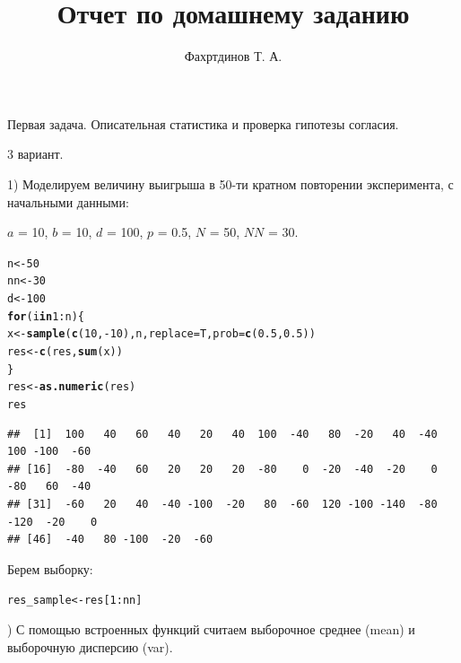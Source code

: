 \documentclass{article}\usepackage[]{graphicx}\usepackage[]{color}
\makeatletter
\newcommand{\hlnum}[1]{\textcolor[rgb]{0.686,0.059,0.569}{#1}}%
\newcommand{\hlopt}[1]{\textcolor[rgb]{0,0,0}{#1}}%
\newcommand{\hlstd}[1]{\textcolor[rgb]{0.345,0.345,0.345}{#1}}%
\newcommand{\hlkwa}[1]{\textcolor[rgb]{0.161,0.373,0.58}{\textbf{#1}}}%
\newcommand{\hlkwb}[1]{\textcolor[rgb]{0.69,0.353,0.396}{#1}}%
\newcommand{\hlkwc}[1]{\textcolor[rgb]{0.333,0.667,0.333}{#1}}%
\newcommand{\hlkwd}[1]{\textcolor[rgb]{0.737,0.353,0.396}{\textbf{#1}}}%
\newenvironment{kframe}{%
 \def\at@end@of@kframe{}%
 \ifinner\ifhmode%
  \def\at@end@of@kframe{\end{minipage}}%
  \begin{minipage}{\columnwidth}%
 \fi\fi%
 \def\FrameCommand##1{\hskip\@totalleftmargin \hskip-\fboxsep
 \colorbox{shadecolor}{##1}\hskip-\fboxsep
     \hskip-\linewidth \hskip-\@totalleftmargin \hskip\columnwidth}%
 \MakeFramed {\advance\hsize-\width
   \@totalleftmargin\z@ \linewidth\hsize
   \@setminipage}}%
 {\par\unskip\endMakeFramed%
 \at@end@of@kframe}
\newenvironment{knitrout}{}{} %
\makeatother
\begin{document}
\title{Отчет по домашнему заданию}
\pretitle{\vspace{\droptitle}\centering\huge}
\posttitle{\par}
\author{Фахртдинов Т. А.}


\maketitle
Первая задача. Описательная статистика и проверка гипотезы согласия.

3 вариант.

1) Моделируем величину выигрыша в 50-ти кратном повторении эксперимента, с начальными данными:

$a$ = 10, $b$ = 10, $d$ = 100, $p$ = 0.5, $N$ = 50, $NN$ = 30.

\begin{knitrout}
\color{fgcolor}\begin{kframe}
\begin{alltt}
\hlstd{n} \hlkwb{<-} \hlnum{50}
\hlstd{nn} \hlkwb{<-} \hlnum{30}
\hlstd{d} \hlkwb{<-} \hlnum{100}
\hlkwa{for} \hlstd{(i} \hlkwa{in} \hlnum{1} \hlopt{:} \hlstd{n) \{}
  \hlstd{x} \hlkwb{<-} \hlkwd{sample}\hlstd{(}\hlkwd{c}\hlstd{(}\hlnum{10}\hlstd{,}\hlopt{-}\hlnum{10}\hlstd{), n,} \hlkwc{replace}\hlstd{=T,} \hlkwc{prob}\hlstd{=}\hlkwd{c}\hlstd{(}\hlnum{0.5}\hlstd{,} \hlnum{0.5}\hlstd{))}
  \hlstd{res} \hlkwb{<-} \hlkwd{c}\hlstd{(res,} \hlkwd{sum}\hlstd{(x))}
\hlstd{\}}
\hlstd{res} \hlkwb{<-} \hlkwd{as.numeric}\hlstd{(res)}
\hlstd{res}
\end{alltt}
\begin{verbatim}
##  [1]  100   40   60   40   20   40  100  -40   80  -20   40  -40  100 -100  -60
## [16]  -80  -40   60   20   20   20  -80    0  -20  -40  -20    0  -80   60  -40
## [31]  -60   20   40  -40 -100  -20   80  -60  120 -100 -140  -80 -120  -20    0
## [46]  -40   80 -100  -20  -60
\end{verbatim}
\end{kframe}
\end{knitrout}
Берем выборку:
\begin{knitrout}
\color{fgcolor}\begin{kframe}
\begin{alltt}
\hlstd{res_sample} \hlkwb{<-} \hlstd{res[}\hlnum{1}\hlopt{:}\hlstd{nn]}
\end{alltt}
\end{kframe}
\end{knitrout}
2) С помощью встроенных функций считаем выборочное среднее (mean) и выборочную дисперсию (var). 
\end{document}
